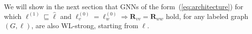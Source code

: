 We will  show in the next section that GNNs of the form~(\ref{eq:architecture}) for which 
$\pmb{\ell}^{(1)}\sqsubseteq\hat{\pmb{\ell}}$  and 
	$\pmb{\ell}^{(0)}_v=\pmb{\ell}^{(0)}_w\Rightarrow \mathbf{R}_{vv}=\mathbf{R}_{ww}$ hold,
 for any labeled graph $(G,\pmb{\ell})$, are also WL-strong,  starting from $\pmb{\ell}$.
 
 

%
%
%
%
%
%


